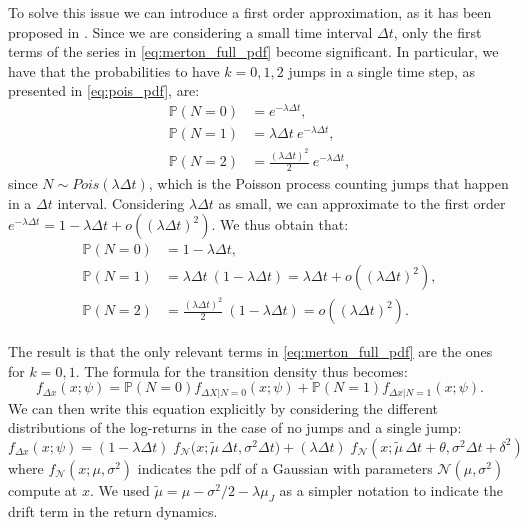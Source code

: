 To solve this issue we can introduce a first order approximation, as it has been proposed in \citep{BALLTOROUS1983}. 
Since we are considering a small time interval $\Delta t $, only the first terms of the series in \eqref{eq:merton_full_pdf} become significant. 
In particular, we have that the probabilities to have $k = 0, 1, 2$ jumps in a single time step, as presented in \eqref{eq:pois_pdf}, are:
\begin{subequations}
	\begin{align}
	\mathbb{P}(N = 0) &= e^{-\lambda \Delta t}, \\
	\mathbb{P}(N = 1) &= \lambda \Delta t \: e^{-\lambda \Delta t}, \\
	\mathbb{P}(N = 2) &= \frac{(\lambda \Delta t)^2}{2} \: e^{-\lambda \Delta t},
	\end{align}
\end{subequations}
\noindent
since $N \sim Pois(\lambda \Delta t)$, which is the Poisson process counting jumps that happen in a $\Delta t$ interval.
Considering $\lambda \Delta t$ as small, we can approximate to the first order  $e^{-\lambda \Delta t} =  1 - \lambda \Delta t +  o((\lambda \Delta t)^2)$. 
We thus obtain that:
\begin{subequations}
	\begin{align}
	\mathbb{P}(N = 0) &= 1-\lambda \Delta t , \\
	\mathbb{P}(N = 1) &= \lambda \Delta t \: (1- \lambda \Delta t) = \lambda \Delta t + o((\lambda \Delta t)^2), \\
	\mathbb{P}(N = 2) &= \frac{(\lambda \Delta t)^2}{2} \: (1-\lambda \Delta t) = o((\lambda \Delta t)^2).
	\end{align}
\end{subequations}


The result is that the only relevant terms in \eqref{eq:merton_full_pdf} are the ones for $ k = 0, 1$.
The formula for the transition density thus  becomes:
\begin{equation}
f_{\Delta x} (x; \psi) = \mathbb{P}(N = 0) f_{\Delta X | N = 0}(x; \psi) + \mathbb{P}(N = 1) f_{\Delta x | N = 1}(x; \psi).
\end{equation}
We can then write this equation explicitly by considering the different distributions of the log-returns in the case of no jumps and a single jump:
\begin{equation}
\label{eq:merton_pdf}
f_{\Delta x} (x; \psi) = (1 - \lambda \Delta t) \;
f_{\mathcal{N}}\Big(x ; \widetilde{\mu}\, \Delta t, \sigma^2 \Delta t\Big) + (\lambda \Delta t)\; f_{\mathcal{N}}(x ; \widetilde{\mu}\, \Delta t + \theta, \sigma^2 \Delta t+\delta^2)
\end{equation}
where $f_{\mathcal{N}}(x ; \mu, \sigma^2)$ indicates the pdf of a Gaussian with parameters $\mathcal{N}(\mu, \sigma^2)$ compute at $x$. We used $\widetilde{\mu} = \mu - \sigma^2/2 -\lambda \mu_J$ as a simpler notation to indicate the drift term in the return dynamics.

